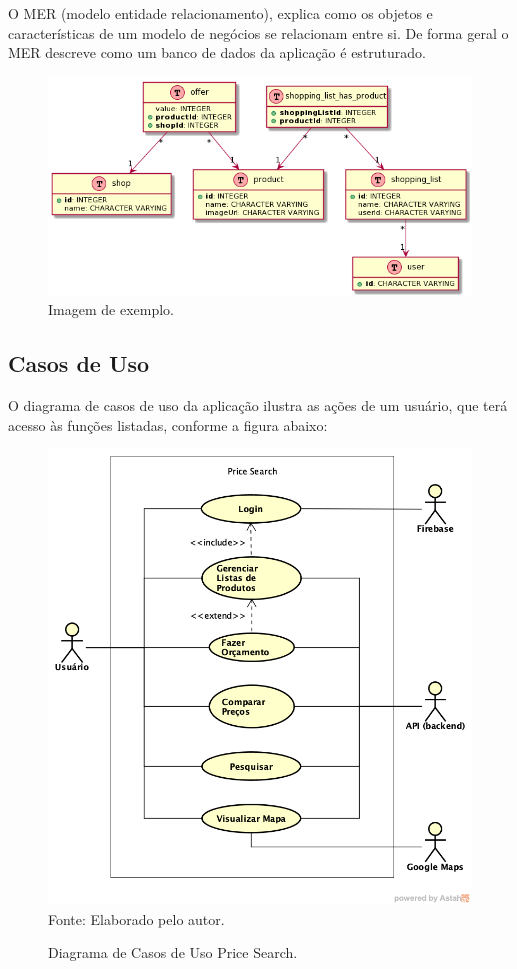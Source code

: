  O MER (modelo entidade relacionamento), explica como os objetos e características de um modelo de negócios se relacionam entre si. De forma geral o MER descreve como um banco de dados da aplicação é estruturado.
 
 
\begin{figure}[!htb]
\centering
\includegraphics[width=\linewidth]{figuras/MER.png}
\caption{Imagem de exemplo.}
\end{figure}
 
  
 
 \subsection{Casos de Uso}
O diagrama de casos de uso da aplicação ilustra as ações de um usuário, que terá acesso às funções listadas, conforme a figura abaixo:

\begin{figure}[!htb]
\centering
\caption{Diagrama de Casos de Uso Price Search.}
\includegraphics[width=\linewidth]{figuras/DiagramaCasosUsoPriceSearch.png}
{\footnotesize Fonte: Elaborado pelo autor.}
\end{figure}

